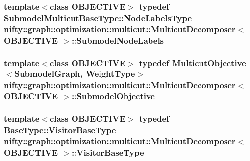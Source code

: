 \subsubsection[{Submodel\+Node\+Labels}]{\setlength{\rightskip}{0pt plus 5cm}template$<$class O\+B\+J\+E\+C\+T\+I\+V\+E$>$ typedef {\bf Submodel\+Multicut\+Base\+Type\+::\+Node\+Labels\+Type} {\bf nifty\+::graph\+::optimization\+::multicut\+::\+Multicut\+Decomposer}$<$ O\+B\+J\+E\+C\+T\+I\+V\+E $>$\+::{\bf Submodel\+Node\+Labels}}\label{classnifty_1_1graph_1_1optimization_1_1multicut_1_1MulticutDecomposer_a21832b392d9987edc34295434ec8ebb2}
\hypertarget{classnifty_1_1graph_1_1optimization_1_1multicut_1_1MulticutDecomposer_ae2ec7761d50f6ba9f50b6593ad6b4f22}{}
\subsubsection[{Submodel\+Objective}]{\setlength{\rightskip}{0pt plus 5cm}template$<$class O\+B\+J\+E\+C\+T\+I\+V\+E$>$ typedef {\bf Multicut\+Objective}$<${\bf Submodel\+Graph}, {\bf Weight\+Type}$>$ {\bf nifty\+::graph\+::optimization\+::multicut\+::\+Multicut\+Decomposer}$<$ O\+B\+J\+E\+C\+T\+I\+V\+E $>$\+::{\bf Submodel\+Objective}}\label{classnifty_1_1graph_1_1optimization_1_1multicut_1_1MulticutDecomposer_ae2ec7761d50f6ba9f50b6593ad6b4f22}
\hypertarget{classnifty_1_1graph_1_1optimization_1_1multicut_1_1MulticutDecomposer_ad1f4a09f99e9fa5ba8ae1bf3227c18f3}{}
\subsubsection[{Visitor\+Base\+Type}]{\setlength{\rightskip}{0pt plus 5cm}template$<$class O\+B\+J\+E\+C\+T\+I\+V\+E$>$ typedef {\bf Base\+Type\+::\+Visitor\+Base\+Type} {\bf nifty\+::graph\+::optimization\+::multicut\+::\+Multicut\+Decomposer}$<$ O\+B\+J\+E\+C\+T\+I\+V\+E $>$\+::{\bf Visitor\+Base\+Type}}\label{classnifty_1_1graph_1_1optimization_1_1multicut_1_1MulticutDecomposer_ad1f4a09f99e9fa5ba8ae1bf3227c18f3}
\hypertarget{classnifty_1_1graph_1_1optimization_1_1multicut_1_1MulticutDecomposer_a53a9d7161f78a1857add8e82d05fbd70}{}
